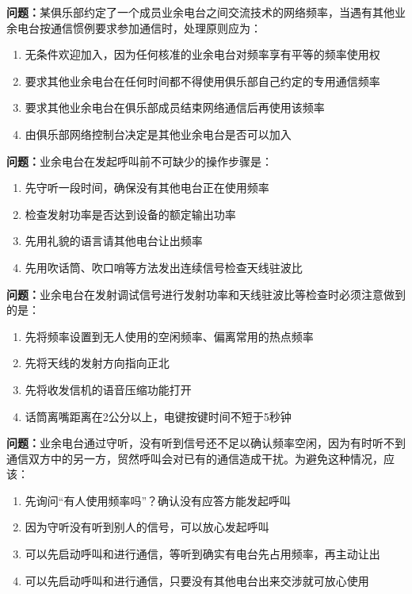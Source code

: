\documentclass{ctexbook}
\begin{document}
\textbf{问题：}某俱乐部约定了一个成员业余电台之间交流技术的网络频率，当遇有其他业余电台按通信惯例要求参加通信时，处理原则应为：
\begin{enumerate}[label=\Alph*), leftmargin=3em]
\item 无条件欢迎加入，因为任何核准的业余电台对频率享有平等的频率使用权
\item 要求其他业余电台在任何时间都不得使用俱乐部自己约定的专用通信频率
\item 要求其他业余电台在俱乐部成员结束网络通信后再使用该频率
\item 由俱乐部网络控制台决定是其他业余电台是否可以加入
\end{enumerate}

\textbf{问题：}业余电台在发起呼叫前不可缺少的操作步骤是：
\begin{enumerate}[label=\Alph*), leftmargin=3em]
\item 先守听一段时间，确保没有其他电台正在使用频率
\item 检查发射功率是否达到设备的额定输出功率
\item 先用礼貌的语言请其他电台让出频率
\item 先用吹话筒、吹口哨等方法发出连续信号检查天线驻波比
\end{enumerate}

\textbf{问题：}业余电台在发射调试信号进行发射功率和天线驻波比等检查时必须注意做到的是：
\begin{enumerate}[label=\Alph*), leftmargin=3em]
\item 先将频率设置到无人使用的空闲频率、偏离常用的热点频率
\item 先将天线的发射方向指向正北
\item 先将收发信机的语音压缩功能打开
\item 话筒离嘴距离在2公分以上，电键按键时间不短于5秒钟
\end{enumerate}

\textbf{问题：}业余电台通过守听，没有听到信号还不足以确认频率空闲，因为有时听不到通信双方中的另一方，贸然呼叫会对已有的通信造成干扰。为避免这种情况，应该：
\begin{enumerate}[label=\Alph*), leftmargin=3em]
\item 先询问“有人使用频率吗”？确认没有应答方能发起呼叫
\item 因为守听没有听到别人的信号，可以放心发起呼叫
\item 可以先启动呼叫和进行通信，等听到确实有电台先占用频率，再主动让出
\item 可以先启动呼叫和进行通信，只要没有其他电台出来交涉就可放心使用
\end{enumerate}
\end{document}
